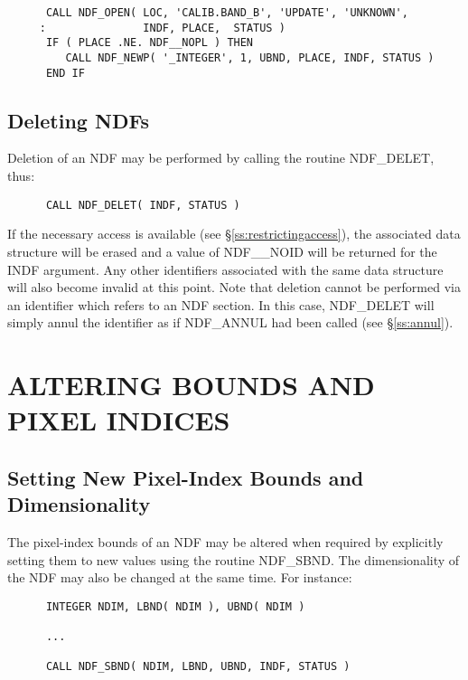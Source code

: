 \documentclass[twoside,11pt]{article}
\newcommand{\htmlref}[2]{#1}
\newcommand{\xlabel}[1]{}
\begin{document}
\small
\begin{verbatim}
      CALL NDF_OPEN( LOC, 'CALIB.BAND_B', 'UPDATE', 'UNKNOWN',
     :               INDF, PLACE,  STATUS )
      IF ( PLACE .NE. NDF__NOPL ) THEN
         CALL NDF_NEWP( '_INTEGER', 1, UBND, PLACE, INDF, STATUS )
      END IF
\end{verbatim}
\normalsize

\subsection{\xlabel{deleting_ndfs}\label{ss:delet}Deleting NDFs}

Deletion of an NDF may be performed by calling the routine \htmlref{NDF\_DELET}{NDF_DELET}, thus:

\small
\begin{verbatim}
      CALL NDF_DELET( INDF, STATUS )
\end{verbatim}
\normalsize

If the necessary access is available (see \S\ref{ss:restrictingaccess}), the
associated data structure will be erased and a value of NDF\_\_NOID will be
returned for the INDF argument. 
Any other identifiers associated with the same data structure will also become
invalid at this point.
Note that deletion cannot be performed via an identifier which refers to an 
NDF section.
In this case, NDF\_DELET will simply annul the identifier as if \htmlref{NDF\_ANNUL}{NDF_ANNUL} 
had been called (see \S\ref{ss:annul}).


\section{\xlabel{altering_bounds_and_pixel_indices}ALTERING BOUNDS AND PIXEL INDICES}

\subsection{\xlabel{setting_new_pixel-index_bounds_and_dimensionality}\label{ss:sbnd}Setting New Pixel-Index Bounds and Dimensionality}

The pixel-index bounds of an NDF may be altered when required by explicitly
setting them to new values using the routine \htmlref{NDF\_SBND}{NDF_SBND}. 
The dimensionality of the NDF may also be changed at the same time. 
For instance:

\small
\begin{verbatim}
      INTEGER NDIM, LBND( NDIM ), UBND( NDIM )

      ...

      CALL NDF_SBND( NDIM, LBND, UBND, INDF, STATUS )
\end{verbatim}
\normalsize
\end{document}

